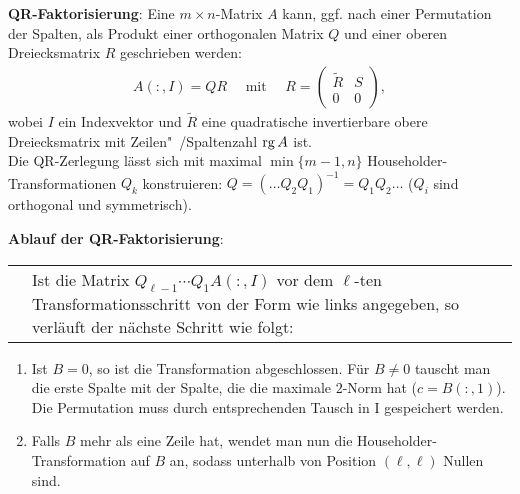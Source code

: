 \linie

\textbf{QR-Faktorisierung}:
Eine $m \times n$-Matrix $A$ kann, ggf. nach einer Permutation der Spalten,
als Produkt einer orthogonalen Matrix $Q$ und einer oberen Dreiecksmatrix
$R$ geschrieben werden:
\begin{align*}
    A(:,I) = QR \quad\text{ mit }\quad
    R = \begin{pmatrix}\widetilde{R} & S \\ 0 & 0\end{pmatrix},
\end{align*}
wobei $I$ ein Indexvektor und $\widetilde{R}$ eine quadratische invertierbare
obere Dreiecksmatrix mit Zei\-len"~/Spaltenzahl $\operatorname{rg} A$ ist. \\
Die QR-Zerlegung lässt sich mit maximal $\min\{m - 1, n\}$
Householder-Transformationen $Q_k$ konstruieren:
$Q = (\dotsc Q_2 Q_1)^{-1} = Q_1 Q_2 \dotsc$
($Q_i$ sind orthogonal und symmetrisch).

\textbf{Ablauf der QR-Faktorisierung}: \\
\begin{tabular}{p{4.5cm}p{11.65cm}}
\matrixsize{$\left(\begin{array}{ccc|ccc}
\ast & \cdots & \ast & \ast & \cdots & \ast \\
& \ddots & \vdots & \vdots & & \vdots \\
0 & & \ast & \ast & \cdots & \ast \\ \hline
& & & & & \\
& 0 & & & B & \\
& & & & & \\
\end{array}\right)$}
&
\begin{minipage}[c]{11.65cm}
Ist die Matrix $Q_{\ell - 1} \dotsm Q_1 A(:,I)$ vor dem $\ell$-ten
Transformationsschritt von der Form wie links angegeben, so verläuft der
nächste Schritt wie folgt:
\end{minipage}\end{tabular}
\begin{enumerate}
    \item Ist $B = 0$, so ist die Transformation abgeschlossen.
    Für $B \not= 0$ tauscht man die erste Spalte mit der Spalte, die
    die maximale $2$-Norm hat ($c = B(:,1)$).
    Die Permutation muss durch entsprechenden Tausch in I gespeichert werden.
    
    \item Falls $B$ mehr als eine Zeile hat, wendet man nun die
    Householder-Transformation auf $B$ an, sodass unterhalb von Position
    $(\ell, \ell)$ Nullen sind.
\end{enumerate}

